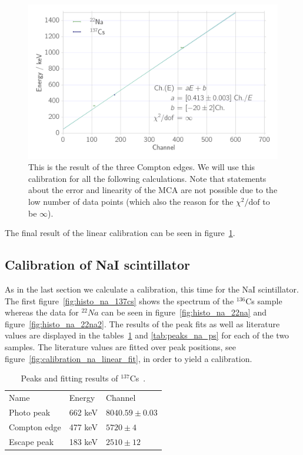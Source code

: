 \begin{figure}[htpb]
    \centering
    \includegraphics[width=0.9\linewidth]{./analysis/figures/calibration_ps_linear_fit}
    \caption{This is the result of the three Compton edges. We will use this calibration
    for all the following calculations. Note that statements about the error and linearity of the MCA 
    are not possible due to the low number of data points (which also the reason for
the $\chi^2/\mathrm{dof}$ to be $\infty$).}
\label{fig:calibration_ps_linear_fit}
\end{figure}
The final result of the linear calibration can be seen in
figure~\ref{fig:calibration_ps_linear_fit}.

\subsection{Calibration of NaI scintillator}

\label{sub:calibration_of_na_scintillator}
As in the last section we calculate a calibration, this time for the NaI scintillator. The
first figure~\ref{fig:histo_na_137cs} shows the spectrum of the $^{136}$Cs sample 
whereas the data for
$^{22}Na$ can be seen in figure~\ref{fig:histo_na_22na} and figure~\ref{fig:histo_na_22na2}.
The results of the peak fits as well as literature values are displayed in the tables~\ref{tab:peaks_cs_ps}
and \ref{tab:peaks_na_ps} for each of the two samples. The literature values are fitted over peak positions, see 
figure~\ref{fig:calibration_na_linear_fit}, in order to yield a calibration. 
\begin{table}[htpb]
    \centering
    \caption{Peaks and fitting results of $^{137}$Cs~\cite{nist}.}
\label{tab:peaks_cs_ps}
    \begin{tabular}{lll}
        \rowcolor{LightCyan} Name &Energy & Channel \\ 
        Photo peak & 662 keV & $8040.59 \pm 0.03$\\ 
        Compton edge & 477 keV & $5720 \pm 4$\\  
        Escape peak & 183 keV & $2510 \pm 12$
    \end{tabular}
\end{table}

